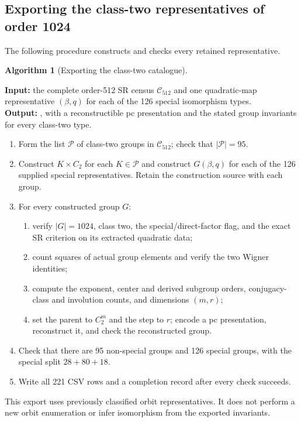 \documentclass[11pt,a4paper]{amsart}
\theoremstyle{definition}
\newtheorem{algorithm}{Algorithm}
\theoremstyle{remark}
\numberwithin{equation}{section}
\begin{document}
\subsection{Exporting the class-two representatives of order 1024}
\label{app:export-class2}
The following procedure constructs and checks every retained representative.

\par\noindent\begin{minipage}{\linewidth}
\begin{algorithm}[Exporting the class-two catalogue]\label{alg:class2-export}
\leavevmode\par
\noindent\textbf{Input:} the complete order-512 SR census $\mathcal C_{512}$
and one quadratic-map representative $(\beta,q)$ for each of the 126
special isomorphism types.\\
\textbf{Output:} , with a reconstructible pc
presentation and the stated group invariants for every class-two type.
\begin{enumerate}
\item Form the list $\mathcal P$ of class-two groups in
$\mathcal C_{512}$; check that $|\mathcal P|=95$.
\item Construct $K\times C_2$ for each $K\in\mathcal P$ and construct
$G(\beta,q)$ for each of the 126 supplied special representatives.
Retain the construction source with each group.
\item For every constructed group $G$:
  \begin{enumerate}
  \item verify $|G|=1024$, class two, the special/direct-factor flag,
  and the exact SR criterion on its extracted quadratic data;
  \item count squares of actual group elements and verify the two
  Wigner identities;
  \item compute the exponent, center and derived subgroup orders,
  conjugacy-class and involution counts, and dimensions $(m,r)$;
  \item set the parent to $C_2^m$ and the step to $r$; encode a pc
  presentation, reconstruct it, and check the reconstructed group.
  \end{enumerate}
\item Check that there are 95 non-special groups and 126 special
  groups, with the special split $28+80+18$.
\item Write all 221 CSV rows and a completion record after every check
  succeeds.
\end{enumerate}
\end{algorithm}
\end{minipage}\par\medskip
This export uses previously classified orbit representatives.  It does
not perform a new orbit enumeration or infer isomorphism from the
exported invariants.
\end{document}
